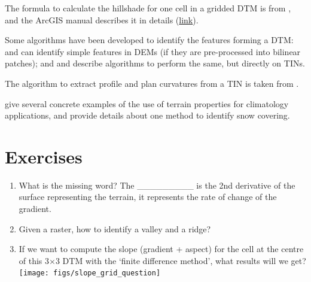 The formula to calculate the hillshade for one cell in a gridded DTM is from \citet{Burrough98}, and the ArcGIS manual describes it in details (\href{https://desktop.arcgis.com/en/arcmap/10.3/tools/spatial-analyst-toolbox/how-hillshade-works.htm}{link}).

Some algorithms have been developed to identify the features forming a DTM: \citet{Kweon94} and \citet{Schneider05} can identify simple features in DEMs (if they are pre-processed into bilinear patches); and \citet{Magillo09} and \citet{Edelsbrunner01-1} describe algorithms to perform the same, but directly on TINs.

The algorithm to extract profile and plan curvatures from a TIN is taken from \citet{vanKreveld97}.

\citet{Bohner09} give several concrete examples of the use of terrain properties for climatology applications, and provide details about one method to identify snow covering.



%
\section{Exercises}

\begin{enumerate}
  \item What is the missing word? The \_\_\_\_\_\_\_\_\_ is the 2nd derivative of the surface representing the terrain, it represents the rate of change of the gradient.
  \item Given a raster, how to identify a valley and a ridge?
  \item If we want to compute the slope (gradient + aspect) for the cell at the centre of this 3$\times$3 DTM with the `finite difference method', what results will we get?
  \\
  \texttt{[image: figs/slope\_grid\_question]}
\end{enumerate}
